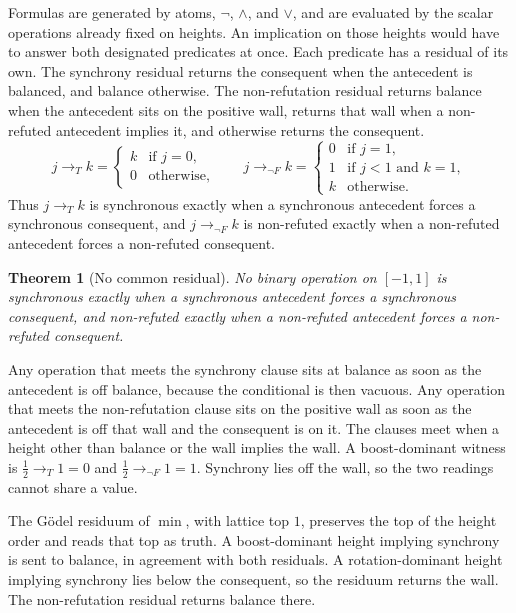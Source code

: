 \documentclass[a4paper]{article}
\newtheorem{theorem}{Theorem}[section]
\theoremstyle{definition}
\begin{document}
Formulas are generated by atoms, \(\neg\), \(\wedge\), and \(\vee\),
and are evaluated by the scalar operations already fixed on heights.
An implication on those heights would have to answer both designated
predicates at once. Each predicate has a residual of its own. The
synchrony residual returns the consequent when the antecedent is
balanced, and balance otherwise. The non-refutation residual returns
balance when the antecedent sits on the positive wall, returns that
wall when a non-refuted antecedent implies it, and otherwise returns
the consequent.
\begin{equation}
\label{eq:residuals}
j\to_T k=
\begin{cases}
k & \text{if }j=0,\\
0 & \text{otherwise,}
\end{cases}
\qquad
j\to_{\lnot F} k=
\begin{cases}
0 & \text{if }j=1,\\
1 & \text{if }j<1\text{ and }k=1,\\
k & \text{otherwise.}
\end{cases}
\end{equation}
Thus \(j\to_T k\) is synchronous exactly when a synchronous antecedent
forces a synchronous consequent, and \(j\to_{\lnot F} k\) is
non-refuted exactly when a non-refuted antecedent forces a non-refuted
consequent.

\begin{theorem}[No common residual]
\label{thm:no-common-imp}
No binary operation on \([-1,1]\) is synchronous exactly when a
synchronous antecedent forces a synchronous consequent, and non-refuted
exactly when a non-refuted antecedent forces a non-refuted consequent.
\end{theorem}

Any operation that meets the synchrony clause sits at balance as soon
as the antecedent is off balance, because the conditional is then
vacuous. Any operation that meets the non-refutation clause sits on
the positive wall as soon as the antecedent is off that wall and the
consequent is on it. The clauses meet when a height other than balance
or the wall implies the wall. A boost-dominant witness is
\(\tfrac12\to_T 1=0\) and \(\tfrac12\to_{\lnot F} 1=1\). Synchrony
lies off the wall, so the two readings cannot share a value.

The G\"odel residuum of \(\min\), with lattice top \(1\), preserves the
top of the height order and reads that top as truth. A boost-dominant
height implying synchrony is sent to balance, in agreement with both
residuals. A rotation-dominant height implying synchrony lies below the
consequent, so the residuum returns the wall. The non-refutation
residual returns balance there.
\end{document}
